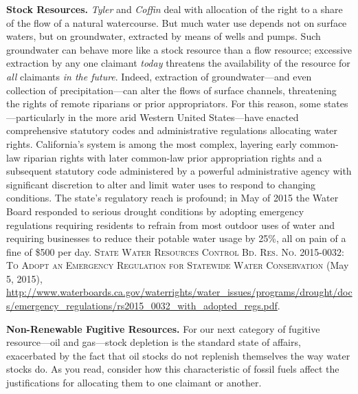 \item \textbf{Stock Resources.} \textit{Tyler} and \textit{Coffin} deal with
allocation of the right to a share of the flow of a natural watercourse. But
much water use depends not on surface waters, but on groundwater, extracted by
means of wells and pumps. Such groundwater can behave more like a stock resource
than a flow resource; excessive extraction by any one claimant \textit{today}
threatens the availability of the resource for \textit{all} claimants \textit{in
the future}. Indeed, extraction of groundwater---and even collection of
precipitation---can alter the flows of surface channels, threatening the rights
of remote riparians or prior appropriators. For this reason, some
states---particularly in the more arid Western United States---have enacted
comprehensive statutory codes and administrative regulations allocating water
rights. California's system is among the most complex, layering early common-law
riparian rights with later common-law prior appropriation rights and a
subsequent statutory code administered by a powerful administrative agency with
significant discretion to alter and limit water uses to respond to changing
conditions. The state's regulatory reach is profound; in May of 2015 the Water
Board responded to serious drought conditions by adopting emergency regulations
requiring residents to refrain from most outdoor uses of water and requiring
businesses to reduce their potable water usage by 25\%, all on pain of a fine of
\$500 per day. \textsc{State Water Resources Control Bd. Res. No. 2015-0032: To
Adopt an Emergency Regulation for Statewide Water Conservation} (May 5, 2015),
\url{http://www.waterboards.ca.gov/waterrights/water_issues/programs/drought/docs/emergency_regulations/rs2015_0032_with_adopted_regs.pdf}.

\item \textbf{Non-Renewable Fugitive Resources.} For our next category of
fugitive resource---oil and gas---stock depletion is the standard state of
affairs, exacerbated by the fact that oil stocks do not replenish themselves the
way water stocks do. As you read, consider how this characteristic of fossil
fuels affect the justifications for allocating them to one claimant or another.


